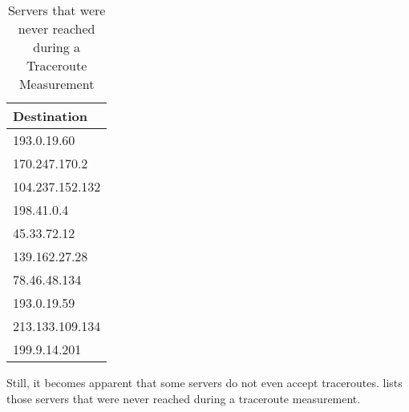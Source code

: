 \begin{table}
	\footnotesize
	\caption{Servers that were never reached during a Traceroute Measurement}
	\label{fig:unreachable-servers}
	\begin{tabular}{l}
		\toprule
		Destination     \\
		\midrule
		193.0.19.60     \\
		170.247.170.2   \\
		104.237.152.132 \\
		198.41.0.4      \\
		45.33.72.12     \\
		139.162.27.28   \\
		78.46.48.134    \\
		193.0.19.59     \\
		213.133.109.134 \\
		199.9.14.201    \\
		\bottomrule
	\end{tabular}
\end{table}

Still, it becomes apparent that some servers do not even accept traceroutes.
 lists those servers that were never reached
during a traceroute measurement.

